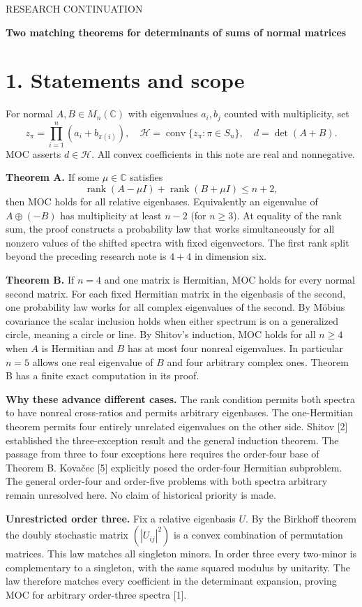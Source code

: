 \documentclass[11pt]{article}
\newcommand{\heading}[1]{\section*{\color{ink}#1}}
\newcommand{\C}{\mathbb C}\newcommand{\R}{\mathbb R}\newcommand{\E}{\mathbb E}\newcommand{\pr}{\mathbb P}
\DeclareMathOperator{\co}{conv}\DeclareMathOperator{\rank}{rank}\DeclareMathOperator{\tr}{tr}\DeclareMathOperator{\diag}{diag}
\begin{document}
{\small\sffamily\color{ink}RESEARCH CONTINUATION}\par
{\LARGE\bfseries Two matching theorems for determinants of sums of normal matrices}\par
\heading{1. Statements and scope}
For normal $A,B\in M_n(\C)$ with eigenvalues $a_i,b_j$ counted with multiplicity, set
\[
 z_\pi=\prod_{i=1}^n(a_i+b_{\pi(i)}),\quad
 \mathcal H=\co\{z_\pi:\pi\in S_n\},\quad d=\det(A+B).
\]
MOC asserts $d\in\mathcal H$. All convex coefficients in this note are real and nonnegative.
\par\textbf{Theorem A.} If some $\mu\in\C$ satisfies
\[
 \rank(A-\mu I)+\rank(B+\mu I)\le n+2 ,
\]
then MOC holds for all relative eigenbases. Equivalently an eigenvalue of $A\oplus(-B)$ has multiplicity at least $n-2$ (for $n\ge3$). At equality of the rank sum, the proof constructs a probability law that works simultaneously for all nonzero values of the shifted spectra with fixed eigenvectors. The first rank split beyond the preceding research note is $4+4$ in dimension six.
\par\textbf{Theorem B.} If $n=4$ and one matrix is Hermitian, MOC holds for every normal second matrix. For each fixed Hermitian matrix in the eigenbasis of the second, one probability law works for all complex eigenvalues of the second. By M\"obius covariance the scalar inclusion holds when either spectrum is on a generalized circle, meaning a circle or line. By Shitov's induction, MOC holds for all $n\ge4$ when $A$ is Hermitian and $B$ has at most four nonreal eigenvalues. In particular $n=5$ allows one real eigenvalue of $B$ and four arbitrary complex ones. Theorem B has a finite exact computation in its proof.
\par\textbf{Why these advance different cases.} The rank condition permits both spectra to have nonreal cross-ratios and permits arbitrary eigenbases. The one-Hermitian theorem permits four entirely unrelated eigenvalues on the other side. Shitov [2] established the three-exception result and the general induction theorem. The passage from three to four exceptions here requires the order-four base of Theorem B. Kova\v{c}ec [5] explicitly posed the order-four Hermitian subproblem. The general order-four and order-five problems with both spectra arbitrary remain unresolved here. No claim of historical priority is made.
\par\textbf{Unrestricted order three.} Fix a relative eigenbasis $U$. By the Birkhoff theorem the doubly stochastic matrix $(|U_{ij}|^2)$ is a convex combination of permutation matrices. This law matches all singleton minors. In order three every two-minor is complementary to a singleton, with the same squared modulus by unitarity. The law therefore matches every coefficient in the determinant expansion, proving MOC for arbitrary order-three spectra [1].
\end{document}

